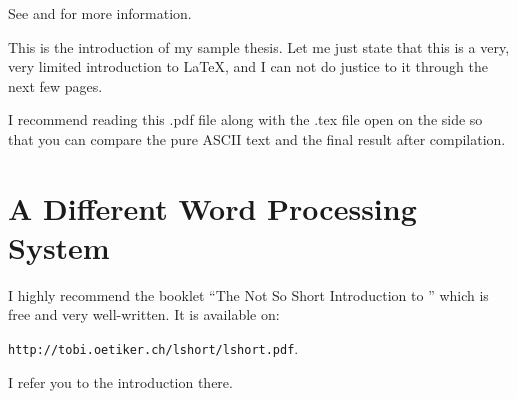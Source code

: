 See \cite{A01} and \cite{ARS03} for more information.

This is the introduction of my sample thesis. Let me just state that
this is a very, very limited introduction to \LaTeX, and I can not
do justice to it through the next few pages.

I recommend reading this .pdf file along with the .tex file open on
the side so that you can compare the pure ASCII text and the final
result after compilation.

\section{A Different Word Processing System} \label{ch:anotherintro}
I highly recommend the booklet ``The Not So Short Introduction to
\LaTeXe{}'' which is free and very well-written. It is available on:
\begin{center}
\verb|http://tobi.oetiker.ch/lshort/lshort.pdf|.
\end{center}

\noindent I refer you to the introduction there.


